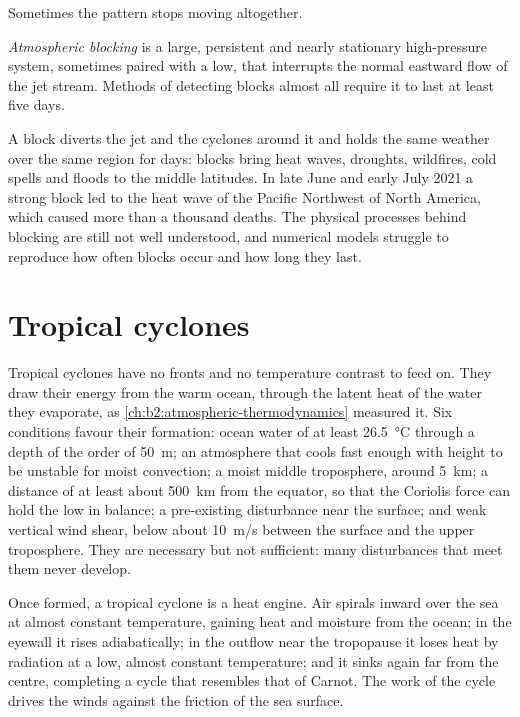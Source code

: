 Sometimes the pattern stops moving altogether.

\begin{definition}\label{def:b2:weather-systems:blocking}
\emph{Atmospheric blocking} is a large, persistent and nearly
stationary high-pressure system, sometimes paired with a low, that interrupts the normal eastward
flow of the jet stream. Methods of detecting blocks almost all require it to last at least five
days.
\end{definition}

A block diverts the jet and the cyclones around it and holds the same weather over the same
region for days: blocks bring heat waves, droughts, wildfires, cold spells and floods to the
middle latitudes. In late June and early July 2021 a strong block led to the heat wave of the
Pacific Northwest of North America, which caused more than a thousand deaths. The physical
processes behind blocking are still not well understood, and numerical models struggle to
reproduce how often blocks occur and how long they last.

\section{Tropical cyclones}\label{sec:b2:weather-systems:tropical}

Tropical cyclones have no fronts and no temperature contrast to feed on. They draw their energy
from the warm ocean, through the latent heat of the water they evaporate, as \cref{ch:b2:atmospheric-thermodynamics}
measured it. Six conditions favour their formation: ocean water of at least \qty{26.5}{\celsius}
through a depth of the order of \qty{50}{m}; an atmosphere that cools fast enough with height to
be unstable for moist convection; a moist middle troposphere, around \qty{5}{km}; a distance of
at least about \qty{500}{km} from the equator, so that the Coriolis force can hold the low in
balance; a pre-existing disturbance near the surface; and weak vertical wind shear, below about
\qty{10}{m/s} between the surface and the upper troposphere. They are necessary but not
sufficient: many disturbances that meet them never develop.

Once formed, a tropical cyclone is a heat engine. Air spirals inward over the sea at almost
constant temperature, gaining heat and moisture from the ocean; in the eyewall it rises
adiabatically; in the outflow near the tropopause it loses heat by radiation at a low,
almost constant temperature; and it sinks again far from the centre, completing a cycle that
resembles that of Carnot. The work of the cycle drives the winds against the friction of the sea
surface.

